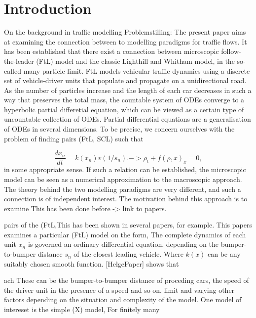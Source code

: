 \chapter{Introduction}

On the background in traffic modelling
Problemstilling: 
The present paper aims at examining the connection between to modelling paradigms for traffic flows. It has been established that there exist a connection between microscopic follow-the-leader (FtL) model and the classic Lighthill and Whitham model, in the so-called many particle limit. FtL models vehicular traffic dynamics using a discrete set of vehicle-driver units that populate and propagate on a unidirectional road. As the number of particles increase and the length of each car decreases in such a way that preserves the total mass, the countable system of ODEs converge to a hyperbolic partial differetial equation, which can be viewed as a certain type of uncountable collection of ODEs. Partial differential equations are a generalisation of ODEs in several dimensions. To be precise, we concern ourselves with the problem of finding pairs (FtL, SCL) such that

\begin{equation}\label{FtL}
    \frac{dx_n}{dt} = k(x_n)v(1/s_n). -> \rho_t + f(\rho,x)_x = 0,
\end{equation}
in some appropriate sense. If such a relation can be established, the microscopic model can be seen as a numerical approximation to the macroscopic approach. The theory behind the two modelling paradigms are very different, and such a connection is of independent interest. The motivation behind this approach is to examine This has been done before -> link to papers.

pairs of the (FtL,This has been shown in several papers, for example. This papers examines a particular (FtL) model on the form, 
The complete dynamics of each unit $x_n$ is governed an ordinary differential equation, depending on the bumper-to-bumper distance $s_n$ of the closest leading vehicle. Where $k(x)$ can be any suitably chosen smooth function.  [HelgePaper] shows that 

ach These can be the bumper-to-bumper distance of proceding cars, the speed of the driver unit in the presence of a speed and so on. limit and varying other factors depending on the situation and complexity of the model. One model of intereset is the simple (X) model,
For finitely many 

\textcite{argall2002rigorous}


